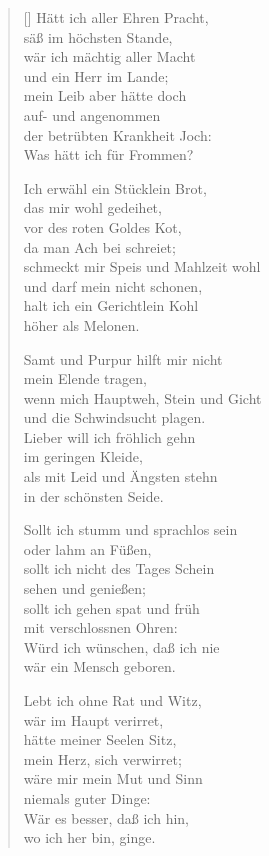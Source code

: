 \begin{multicols}{2}
\begin{verse}[\versewidth]
 Hätt ich aller Ehren Pracht,\\
säß im höchsten Stande,\\
wär ich mächtig aller Macht\\
und ein Herr im Lande;\\
mein Leib aber hätte doch\\
auf- und angenommen\\
der betrübten Krankheit Joch:\\
Was hätt ich für Frommen?

 Ich erwähl ein Stücklein Brot,\\
das mir wohl gedeihet,\\
vor des roten Goldes Kot,\\
da man Ach bei schreiet;\\
schmeckt mir Speis und Mahlzeit wohl\\
und darf mein nicht schonen,\\
halt ich ein Gerichtlein Kohl\\
höher als Melonen.

\vfill\null
\columnbreak

 Samt und Purpur hilft mir nicht\\
mein Elende tragen,\\
wenn mich Hauptweh, Stein und Gicht\\
und die Schwindsucht plagen.\\
Lieber will ich fröhlich gehn\\
im geringen Kleide,\\
als mit Leid und Ängsten stehn\\
in der schönsten Seide.

 Sollt ich stumm und sprachlos sein\\
oder lahm an Füßen,\\
sollt ich nicht des Tages Schein\\
sehen und genießen;\\
sollt ich gehen spat und früh\\
mit verschlossnen Ohren:\\
Würd ich wünschen, daß ich nie\\
wär ein Mensch geboren.

 Lebt ich ohne Rat und Witz,\\
wär im Haupt verirret,\\
hätte meiner Seelen Sitz,\\
mein Herz, sich verwirret;\\
wäre mir mein Mut und Sinn\\
niemals guter Dinge:\\
Wär es besser, daß ich hin,\\
wo ich her bin, ginge.


\end{verse}
\end{multicols}
